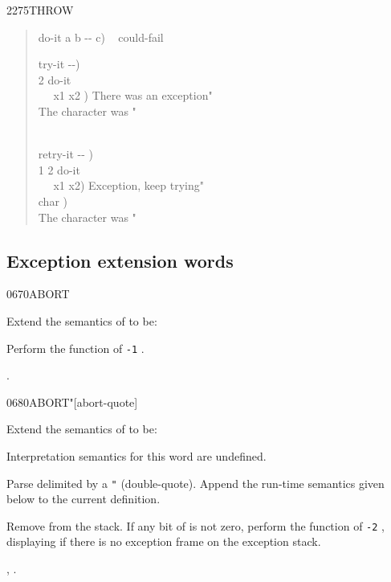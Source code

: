\begin{worddef}{2275}{THROW}
\begin{defer}
\begin{quote}
		\word{:} do-it  a b -{}- c) ~
			 could-fail \word{;}

		\word{:} try-it  -{}-) \\
		 2 \word{[']} do-it~ ~  \\
		\tab~~  x1 x2 ) 
			  There was an exception"  \\
		\tab {}
			 The character was "   \\
		\tab {} \\
		\word{;}

		\word{;} retry-it  -{}- ) \\
		\tab {}  1 2 \word{[']} do-it ~
			 \\
		\tab~~  x1 x2) 
			 Exception, keep trying"  \\
		\tab {}  char ) \\
		\tab {} The character was "   \\
		\word{;}
	\end{quote}
\end{defer}
\end{worddef}


\subsection{Exception extension words} %
\extended

\begin{worddef}{0670}{ABORT}
\item Extend the semantics of  to be:


	Perform the function of \texttt{-1} .

\see {}.
\end{worddef}


\begin{worddef}[ABORTq]{0680}{ABORT"}[abort-quote]
\item Extend the semantics of  to be:

\interpret
	Interpretation semantics for this word are undefined.

\compile

	Parse  delimited by a \texttt{"} (double-quote).
	Append the run-time semantics given below to the current
	definition.

\runtime

	Remove  from the stack. If any bit of 
	is not zero, perform the function of \texttt{-2} ,
	displaying  if there is no exception frame on the
	exception stack.

\see {},
	.
\end{worddef}
